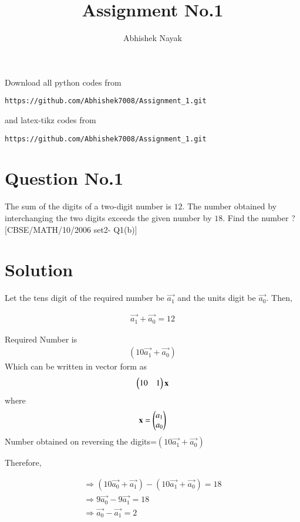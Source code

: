 \documentclass[journal,12pt,twocolumn]{IEEEtran}
\begin{document}
\def\rightbox#1{\makebox[0in][r]{#1}}
\def\centbox#1{\makebox[0in]{#1}}
\def\topbox#1{\raisebox{-\baselineskip}[0in][0in]{#1}}
\def\midbox#1{\raisebox{-0.5\baselineskip}[0in][0in]{#1}}
\vspace{3cm}
\title{Assignment No.1}
\author{Abhishek Nayak}
\maketitle
\newpage
\bigskip
\renewcommand{\thefigure}{\theenumi}
\renewcommand{\thetable}{\theenumi}
Download all python codes from
\begin{lstlisting}
https://github.com/Abhishek7008/Assignment_1.git
\end{lstlisting}
%
and latex-tikz codes from
%
\begin{lstlisting}
https://github.com/Abhishek7008/Assignment_1.git
\end{lstlisting}
%
\section{Question No.1}

The sum of the digits of a two-digit number is $12$. The number obtained by interchanging the two digits exceeds the given number by $18$. Find the number ?
[CBSE/MATH/10/2006 set2- Q1(b)]
\section{Solution}

Let the tens digit of the required number be $\vec{a_1}$ and the units digit be $\vec{a_0}$. Then,

\begin{align}
     \vec{a_1}+\vec{a_0}=12\label{eq1}
\end{align}
   
Required Number is 
\begin{align}
(10\vec{a_1}+\vec{a_0})
\end{align}
Which can be written in vector form as
\begin{align}
    \begin{pmatrix}10&1\end{pmatrix}\mathbf{x}
\end{align}
where 
\begin{align}
    \mathbf{x}=\begin{pmatrix}a_1\\a_0\end{pmatrix}
\end{align}
Number obtained on reversing the digits=$(10\vec{a_1}+\vec{a_0})$

Therefore,

\begin{align}
  \Rightarrow (10\vec{a_0}+\vec{a_1})-(10\vec{a_1}+\vec{a_0})
  =18\\
  \Rightarrow  9\vec{a_0}-9\vec{a_1}=18
  \\ 
  \Rightarrow \vec{a_0}-\vec{a_1}=2\label{eq2}
\end{align}
\end{document}
